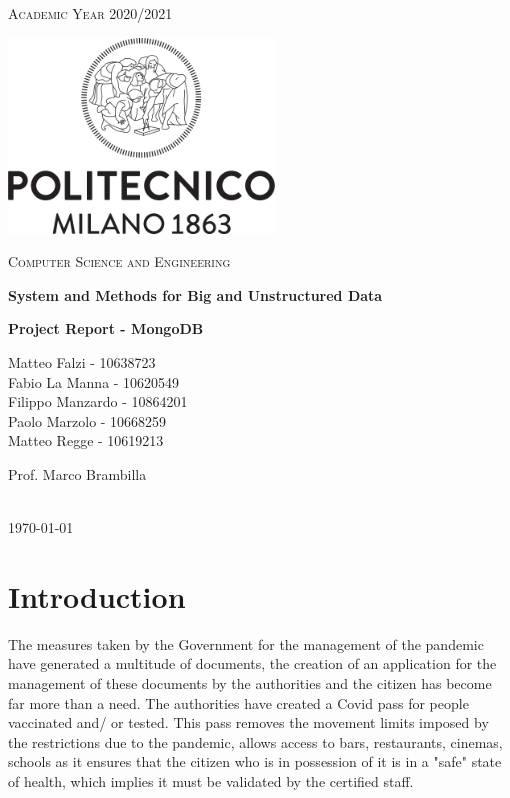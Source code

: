 \documentclass[table, 12pt]{article}
\begin{document}
\setlength{\parindent}{0em}

\begin{titlepage}
    \centering
    \vspace{2cm}
    \scshape\large Academic Year 2020/2021 \par
    \vfill
    \includegraphics[width=200pt]{images/LogoPoliMI}\par\vspace{1cm}
    {\scshape\LARGE Computer Science and Engineering \par}
    \vspace{1.5cm}
    {\Large\bfseries System and Methods for Big and Unstructured Data \par}
    \vspace{0.5cm}
    {\huge\bfseries \textbf{Project Report - MongoDB} \par}
    \vspace{2cm}
    {\large{Matteo Falzi - 10638723\\ Fabio La Manna - 10620549 \\ Filippo Manzardo - 10864201 \\ Paolo Marzolo - 10668259 \\ Matteo Regge -  10619213}\par}
    \vfill
    {\large Prof. Marco Brambilla }
    \vfill
    {\large \textbf{}\\ \today \par}
\end{titlepage}
\thispagestyle{plain}
\mbox{}


\section{Introduction}

The measures taken by the Government for the management of the pandemic have generated a multitude of documents, the creation of an application for the management of these documents by the authorities and the citizen has become  far more than a need. The authorities  have created a Covid pass for people vaccinated and/ or tested. This pass removes the movement limits imposed by the restrictions due to the pandemic, allows access to bars, restaurants, cinemas, schools as it ensures that the citizen who is in possession of it is in a "safe" state of health, which implies it must be validated by the certified staff.
\end{document}
